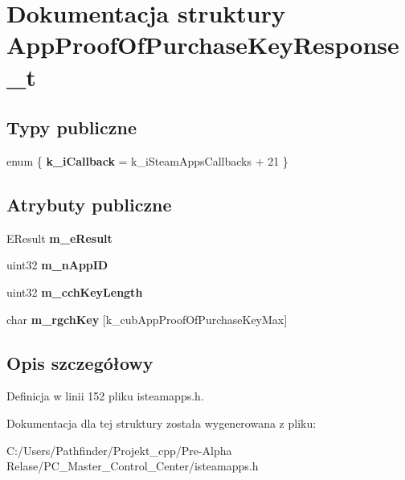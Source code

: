 \hypertarget{struct_app_proof_of_purchase_key_response__t}{}\section{Dokumentacja struktury App\+Proof\+Of\+Purchase\+Key\+Response\+\_\+t}
\label{struct_app_proof_of_purchase_key_response__t}
\subsection*{Typy publiczne}
\begin{DoxyCompactItemize}
\item 
\mbox{\label{struct_app_proof_of_purchase_key_response__t_aaa43ae6db3eb9135d3ca779562d872b8}} 
enum \{ {\bfseries k\+\_\+i\+Callback} = k\+\_\+i\+Steam\+Apps\+Callbacks + 21
 \}
\end{DoxyCompactItemize}
\subsection*{Atrybuty publiczne}
\begin{DoxyCompactItemize}
\item 
\mbox{\label{struct_app_proof_of_purchase_key_response__t_adc41cc95f68943c6e96a872a5faceb74}} 
E\+Result {\bfseries m\+\_\+e\+Result}
\item 
\mbox{\label{struct_app_proof_of_purchase_key_response__t_a080b12d479f7498d3340d1b833f16c1d}} 
uint32 {\bfseries m\+\_\+n\+App\+ID}
\item 
\mbox{\label{struct_app_proof_of_purchase_key_response__t_a00820503a3c0448b895276fb249ccd46}} 
uint32 {\bfseries m\+\_\+cch\+Key\+Length}
\item 
\mbox{\label{struct_app_proof_of_purchase_key_response__t_a081ecfd9ddc6bd03820dd29f340d76c2}} 
char {\bfseries m\+\_\+rgch\+Key} \mbox{[}k\+\_\+cub\+App\+Proof\+Of\+Purchase\+Key\+Max\mbox{]}
\end{DoxyCompactItemize}


\subsection{Opis szczegółowy}


Definicja w linii 152 pliku isteamapps.\+h.



Dokumentacja dla tej struktury została wygenerowana z pliku\+:\begin{DoxyCompactItemize}
\item 
C\+:/\+Users/\+Pathfinder/\+Projekt\+\_\+cpp/\+Pre-\/\+Alpha Relase/\+P\+C\+\_\+\+Master\+\_\+\+Control\+\_\+\+Center/isteamapps.\+h\end{DoxyCompactItemize}
